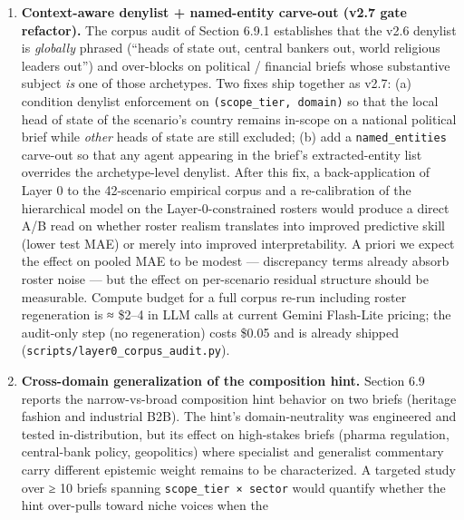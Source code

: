 \documentclass[
]{article}
\begin{document}
\begin{enumerate}
  \textbf{Expanded market data coverage.} Extending market enrichment
  from 14 to all 42 scenarios---using sector ETFs as proxies for
  political, public health, and environmental domains---would increase
  the effective sample for financial linkage parameter estimation,
  potentially pushing λ\_fin above the identifiability threshold.
\item
  \textbf{Context-aware denylist + named-entity carve-out (v2.7 gate
  refactor).} The corpus audit of Section 6.9.1 establishes that the
  v2.6 denylist is \emph{globally} phrased (``heads of state out,
  central bankers out, world religious leaders out'') and over-blocks on
  political / financial briefs whose substantive subject \emph{is} one
  of those archetypes. Two fixes ship together as v2.7: (a) condition
  denylist enforcement on \texttt{(scope\_tier,\ domain)} so that the
  local head of state of the scenario's country remains in-scope on a
  national political brief while \emph{other} heads of state are still
  excluded; (b) add a \texttt{named\_entities} carve-out so that any
  agent appearing in the brief's extracted-entity list overrides the
  archetype-level denylist. After this fix, a back-application of Layer
  0 to the 42-scenario empirical corpus and a re-calibration of the
  hierarchical model on the Layer-0-constrained rosters would produce a
  direct A/B read on whether roster realism translates into improved
  predictive skill (lower test MAE) or merely into improved
  interpretability. A priori we expect the effect on pooled MAE to be
  modest --- discrepancy terms already absorb roster noise --- but the
  effect on per-scenario residual structure should be measurable.
  Compute budget for a full corpus re-run including roster regeneration
  is ≈ \$2--4 in LLM calls at current Gemini Flash-Lite pricing; the
  audit-only step (no regeneration) costs \$0.05 and is already shipped
  (\texttt{scripts/layer0\_corpus\_audit.py}).
\item
  \textbf{Cross-domain generalization of the composition hint.} Section
  6.9 reports the narrow-vs-broad composition hint behavior on two
  briefs (heritage fashion and industrial B2B). The hint's
  domain-neutrality was engineered and tested in-distribution, but its
  effect on high-stakes briefs (pharma regulation, central-bank policy,
  geopolitics) where specialist and generalist commentary carry
  different epistemic weight remains to be characterized. A targeted
  study over ≥ 10 briefs spanning \texttt{scope\_tier\ ×\ sector} would
  quantify whether the hint over-pulls toward niche voices when the

\end{enumerate}
\end{document}
